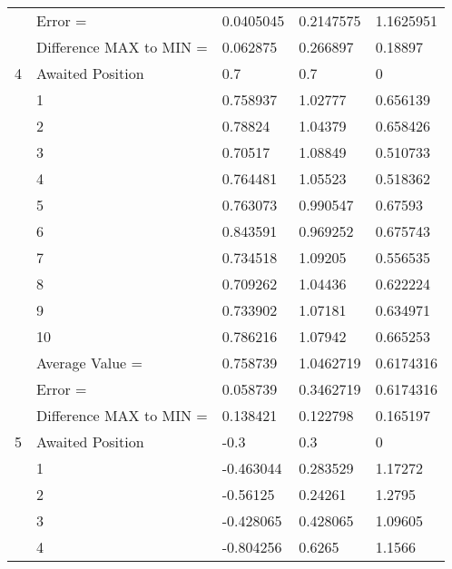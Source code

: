 \begin{tabular}{|p{2cm}|p{3cm}|p{3cm}|p{3cm}|p{3cm}|}
             & Error =                 & 0.0405045    & 0.2147575    & 1.1625951  \\
             & Difference MAX to MIN = & 0.062875     & 0.266897     & 0.18897    \\
\hline
4            & Awaited Position        & 0.7          & 0.7          & 0          \\
             & 1                       & 0.758937     & 1.02777      & 0.656139   \\
             & 2                       & 0.78824      & 1.04379      & 0.658426   \\
             & 3                       & 0.70517      & 1.08849      & 0.510733   \\
             & 4                       & 0.764481     & 1.05523      & 0.518362   \\
             & 5                       & 0.763073     & 0.990547     & 0.67593    \\
             & 6                       & 0.843591     & 0.969252     & 0.675743   \\
             & 7                       & 0.734518     & 1.09205      & 0.556535   \\
             & 8                       & 0.709262     & 1.04436      & 0.622224   \\
             & 9                       & 0.733902     & 1.07181      & 0.634971   \\
             & 10                      & 0.786216     & 1.07942      & 0.665253   \\
             & Average Value =         & 0.758739     & 1.0462719    & 0.6174316  \\
             & Error =                 & 0.058739     & 0.3462719    & 0.6174316  \\
             & Difference MAX to MIN = & 0.138421     & 0.122798     & 0.165197   \\
\hline
5            & Awaited Position        & -0.3         & 0.3          & 0          \\
             & 1                       & -0.463044    & 0.283529     & 1.17272    \\
             & 2                       & -0.56125     & 0.24261      & 1.2795     \\
             & 3                       & -0.428065    & 0.428065     & 1.09605    \\
             & 4                       & -0.804256    & 0.6265       & 1.1566     \\

\end{tabular}
